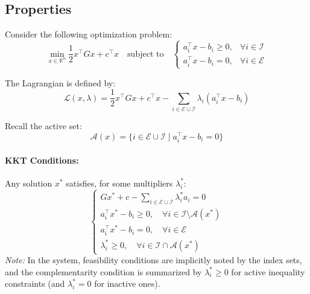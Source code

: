 \subsection{Properties}


Consider the following optimization problem:
    \begin{equation}
        \min_{x \in \mathbb{R}^n} \frac{1}{2} x^\top G x + c^\top x \quad \text{subject to} \quad
        \begin{cases}
            a_i^\top x - b_i \ge 0, & \forall i \in \mathcal{I} \\
            a_i^\top x - b_i = 0, & \forall i \in \mathcal{E}
        \end{cases}
    \end{equation}

    The Lagrangian is defined by:
    \begin{equation}
        \mathcal{L}(x, \lambda) = \frac{1}{2} x^\top G x + c^\top x - \sum_{i \in \mathcal{E} \cup \mathcal{I}} \lambda_i (a_i^\top x - b_i)
    \end{equation}

    Recall the active set:
    \begin{equation}
        \mathcal{A}(x) = \{ i \in \mathcal{E} \cup \mathcal{I} \mid a_i^\top x - b_i = 0 \}
    \end{equation}

    \paragraph{KKT Conditions:}
    Any solution $x^*$ satisfies, for some multipliers $\lambda_i^*$:
    \begin{equation}
        \begin{cases}
            G x^* + c - \sum_{i \in \mathcal{E} \cup \mathcal{I}} \lambda_i^* a_i = 0 \\
            a_i^\top x^* - b_i \ge 0, \quad \forall i \in \mathcal{I} \setminus \mathcal{A}(x^*) \\
            a_i^\top x^* - b_i = 0, \quad \forall i \in \mathcal{E} \\
            \lambda_i^* \ge 0, \quad \forall i \in \mathcal{I} \cap \mathcal{A}(x^*)
        \end{cases}
    \end{equation}
    \emph{Note:} In the system, feasibility conditions are implicitly noted by the index sets, and the complementarity condition is summarized by $\lambda_i^* \ge 0$ for active inequality constraints (and $\lambda_i^* = 0$ for inactive ones).

